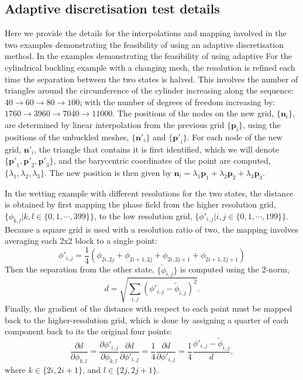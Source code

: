 \documentclass[twocolumn,10pt]{revtex4-2}
\begin{document}
\subsection{Adaptive discretisation test details}
Here we provide the details for the interpolations and mapping involved in the two examples demonstrating the feasibility of using an adaptive discretisation method.
In the examples demonstrating the feasibility of using adaptive 
For the cylindrical buckling example with a changing mesh, the resolution is refined each time the separation between the two states is halved. 
This involves the number of triangles around the circumference of the cylinder increasing along the sequence: $40 \rightarrow 60 \rightarrow 80 \rightarrow 100$; with the number of degrees of freedom increasing by: $1760 \rightarrow 3960 \rightarrow 7040 \rightarrow 11000$.
The positions of the nodes on the new grid, $\{\bm{n}_i\}$, are determined by linear interpolation from the previous grid $\{\bm{p}_i\}$, using the positions of the unbuckled meshes, $\{\bm{n'}_i\}$ and $\{\bm{p'}_i\}$.
For each node of the new grid, $\bm{n'}_i$, the triangle that contains it is first identified, which we will denote $\{\bm{p'}_1,\bm{p'}_2,\bm{p'}_3\}$, and the barycentric coordinates of the point are computed, $\{\lambda_1,\lambda_2,\lambda_3\}$.
The new position is then given by $\bm{n}_i = \lambda_1 \bm{p}_1 + \lambda_2 \bm{p}_2 + \lambda_3 \bm{p}_3$.

In the wetting example with different resolutions for the two states, the distance is obtained by first mapping the phase field from the higher resolution grid, $\{\phi_{k,l} | k,l \in \{0,1,\cdots,399\}\}$, to the low resolution grid, $\{\phi'_{i,j} | i,j \in \{0,1,\cdots,199\}\}$.
Because a square grid is used with a resolution ratio of two, the mapping involves averaging each 2x2 block to a single point:
\begin{equation}
  \phi'_{i,j} = \frac{1}{4} \left( \phi_{2i,2j} + \phi_{2i+1,2j} + \phi_{2i,2j+1} + \phi_{2i+1,2j+1} \right)
\end{equation}
Then the separation from the other state, $\{\widetilde{\phi}_{i,j}\}$ is computed using the 2-norm,
\begin{equation}
  d = \sqrt{\sum_{i,j} \left( \phi'_{i,j} - \widetilde{\phi}_{i,j} \right)^2}.
\end{equation}
Finally, the gradient of the distance with respect to each point must be mapped back to the higher-resolution grid, which is done by assigning a quarter of each component back to its the original four points:
\begin{equation}
  \frac{\partial d}{\partial \phi_{k,l}} =
    \frac{\partial \phi'_{i,j}}{\partial \phi_{k,l}} \frac{\partial d}{\partial \phi'_{i,j}} =
    \frac{1}{4} \frac{\partial d}{\partial \phi'_{i,j}} =
    \frac{1}{4} \frac{\phi'_{i,j} - \widetilde{\phi}_{i,j}}{d},
\end{equation}
where $k \in \{2i, 2i+1\}$, and $l \in \{2j, 2j+1\}$.
\end{document}
